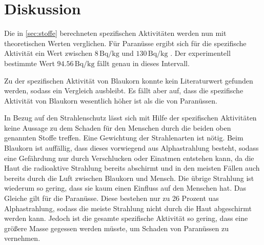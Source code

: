 \section{Diskussion}
\label{sec:Diskussion}

Die in \autoref{sec:stoffe} berechneten spezifischen Aktivitäten werden nun mit theoretischen Werten verglichen. Für Paranüsse ergibt sich für die spezifische 
Aktivität ein Wert zwischen $8\,\unit{\becquerel\per\kilo\gram}$ und $130\,\unit{\becquerel\per\kilo\gram}$ \cite{ap700}. Der experimentell bestimmte Wert 
$94.56\,\unit{\becquerel\per\kilo\gram}$ fällt genau in dieses Intervall.

Zu der spezifischen Aktivität von Blaukorn konnte kein Literaturwert gefunden werden, sodass ein Vergleich ausbleibt. Es fällt aber auf, dass die 
spezifische Aktivität von Blaukorn wesentlich höher ist als die von Paranüssen. 

In Bezug auf den Strahlenschutz lässt sich mit Hilfe  der spezifischen Aktivitäten keine Aussage zu dem Schaden für den Menschen durch die beiden oben genannten 
Stoffe treffen. Eine Gewichtung der Strahlenarten ist nötig. Beim Blaukorn ist auffällig, dass dieses vorwiegend aus Alphastrahlung besteht, sodass eine 
Gefährdung nur durch Verschlucken oder Einatmen entstehen kann, da die Haut die radioaktive Strahlung bereits abschirmt und in den meisten Fällen auch bereits 
durch die Luft zwischen Blaukorn und Mensch. Die übrige Strahlung ist wiederum so gering, dass sie kaum einen Einfluss auf den Menschen hat. Das Gleiche 
gilt für die Paranüsse. Diese bestehen nur zu 26 Prozent uas Alphastrahlung, sodass die meiste Strahlung nicht durch die Haut abgeschirmt werden kann. 
Jedoch ist die gesamte spezifische Aktivität so gering, dass eine größere Masse gegessen werden müsste, um Schaden von Paranüssen zu vernehmen.
